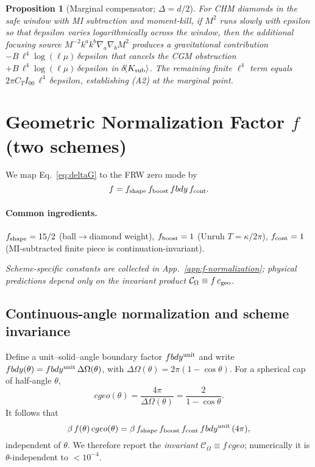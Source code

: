 \documentclass[aps,prd,onecolumn,superscriptaddress,nofootinbib]{revtex4-2}
\def\cgeo{cgeo}%
\def\fbdy{fbdy}%
\def\eps{epsilon}%
\newcommand{\cgeo}{c_{\rm geo}}
\newcommand{\fbdy}{f_{\rm bdy}}
\newcommand{\eps}{\varepsilon}
\newtheorem{proposition}{Proposition}
\begin{document}
\begin{proposition}[Marginal compensator; \(\Delta=d/2\)]
\label{prop:marginal}
For CHM diamonds in the safe window with MI subtraction and moment-kill, if \(M^2\) runs slowly with \(\eps\) so that \(\delta\eps\) varies logarithmically across the window, then the additional focusing source \(M^{-2}k^a k^b\nabla_a\nabla_b M^2\) produces a gravitational contribution \(-B\,\ell^4\log(\ell\mu)\,\delta\eps\) that cancels the CGM obstruction \(+B\,\ell^4\log(\ell\mu)\,\delta\eps\) in \(\delta\!\langle K_{\rm sub}\rangle\). The remaining finite \(\ell^4\) term equals \(2\pi C_T I_{00}\,\ell^4\,\delta\eps\), establishing (A2) at the marginal point.
\end{proposition}

\section{Geometric Normalization Factor \texorpdfstring{$f$}{f} (two schemes)}
\label{sec:f-norm}
We map Eq.~\eqref{eq:deltaG} to the FRW zero mode by
\begin{equation}
f = f_{\rm shape}\, f_{\rm boost}\, \fbdy\, f_{\rm cont}.
\end{equation}

\paragraph*{Common ingredients.}
$f_{\rm shape}=15/2$ (ball$\to$diamond weight), $f_{\rm boost}=1$ (Unruh $T=\kappa/2\pi$), $f_{\rm cont}=1$ (MI-subtracted finite piece is continuation-invariant).

\emph{Scheme-specific constants are collected in App.~\ref{app:f-normalization}; physical predictions depend only on the invariant product \(\mathcal C_\Omega\equiv f\,c_{\rm geo}\).}

\subsection{Continuous-angle normalization and scheme invariance}
\label{sec:theta-invariance}
Define a unit--solid--angle boundary factor $\fbdy^{\rm unit}$ and write
$\fbdy(\theta)=\fbdy^{\rm unit}\,\Delta\Omega(\theta)$, with $\Delta\Omega(\theta)=2\pi(1-\cos\theta)$.
For a spherical cap of half-angle $\theta$,
\begin{equation}
\cgeo(\theta)=\frac{4\pi}{\Delta\Omega(\theta)}=\frac{2}{1-\cos\theta}.
\end{equation}
It follows that
\begin{equation}
\beta\,f(\theta)\,\cgeo(\theta)
= \beta\,f_{\rm shape}\,f_{\rm boost}\,f_{\rm cont}\,\fbdy^{\rm unit}\,(4\pi),
\end{equation}
independent of $\theta$. We therefore report the \emph{invariant} $\mathcal C_\Omega\equiv f\,\cgeo$; numerically it is $\theta$-independent to $<10^{-4}$.
\end{document}
